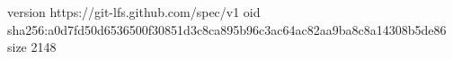 version https://git-lfs.github.com/spec/v1
oid sha256:a0d7fd50d6536500f30851d3c8ca895b96c3ac64ac82aa9ba8c8a14308b5de86
size 2148

